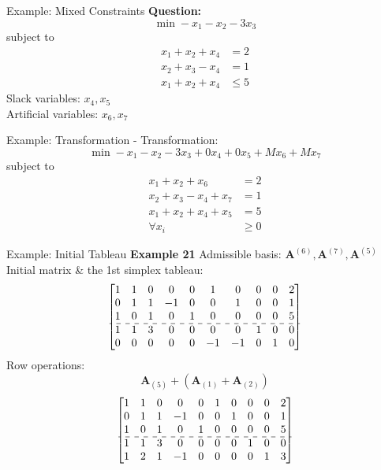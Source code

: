 \documentclass[aspectratio=169,hyperref,UTF8,CJK]{beamer}
\begin{document}
\begin{frame}{Example: Mixed Constraints}
\textbf{Question:}
\[
\min -x_1 - x_2 - 3x_3
\]
subject to
\begin{align*}
x_1 + x_2 + x_4 &= 2 \\
x_2 + x_3 - x_4 &= 1 \\
x_1 + x_2 + x_4 &\le 5
\end{align*}
Slack variables: \(x_4, x_5\) \\
Artificial variables: \(x_6, x_7\)
\end{frame}

\begin{frame}{Example: Transformation}
- Transformation:
\[
\min -x_{1} -x_{2} -3x_{3} + 0x_{4} + 0x_{5} + Mx_{6} + Mx_{7}
\]
subject to
\begin{align*}
x_1 + x_2 + x_6 &= 2 \\
x_2 + x_3 - x_4 + x_7 &= 1 \\
x_1 + x_2 + x_4 + x_5 &= 5 \\
\forall x_i &\geq 0
\end{align*}
\end{frame}

\begin{frame}{Example: Initial Tableau}
\textbf{Example 21}
Admissible basis: \(\mathbf{A}^{(6)}, \mathbf{A}^{(7)}, \mathbf{A}^{(5)}\) \\
Initial matrix \& the 1st simplex tableau:
\[
\begin{bmatrix}
1 & 1 & 0 & 0 & 0 & 1 & 0 & 0 & 0 & 2 \\
0 & 1 & 1 & -1 & 0 & 0 & 1 & 0 & 0 & 1 \\
1 & 0 & 1 & 0 & 1 & 0 & 0 & 0 & 0 & 5 \\
\hdashline 1 & 1 & 3 & 0 & 0 & 0 & 0 & 1 & 0 & 0 \\
0 & 0 & 0 & 0 & 0 & -1 & -1 & 0 & 1 & 0
\end{bmatrix}
\]
Row operations:
\[
\mathbf{A}_{(5)} + (\mathbf{A}_{(1)} + \mathbf{A}_{(2)})
\]
\[
\begin{bmatrix}
1 & 1 & 0 & 0 & 0 & 1 & 0 & 0 & 0 & 2 \\
0 & 1 & 1 & -1 & 0 & 0 & 1 & 0 & 0 & 1 \\
1 & 0 & 1 & 0 & 1 & 0 & 0 & 0 & 0 & 5 \\
\hdashline 1 & 1 & 3 & 0 & 0 & 0 & 0 & 1 & 0 & 0 \\
1 & 2 & 1 & -1 & 0 & 0 & 0 & 0 & 1 & 3
\end{bmatrix}
\]
\end{frame}
\end{document}

